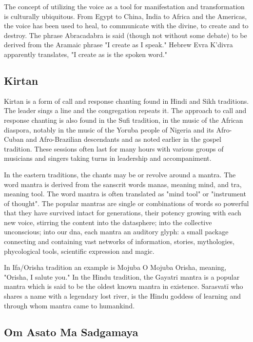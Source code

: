 \documentclass[12pt]{article}
\begin{document}
The concept of utilizing the voice as a tool for manifestation and transformation is culturally ubiquitous. From Egypt to China, India to Africa and the Americas, the voice has been used to heal, to communicate with the divine, to create and to destroy. The phrase Abracadabra is said (though not without some debate) to be derived from the Aramaic phrase "I create as I speak." Hebrew Evra K'divra apparently translates, "I create as is the spoken word."

\subsection*{Kirtan}

Kirtan is a form of call and response chanting found in Hindi and Sikh traditions. The leader sings a line and the congregation repeats it. The approach to call and response chanting is also found in the Sufi tradition, in the music of the African diaspora, notably in the music of the Yoruba people of Nigeria and its Afro-Cuban and Afro-Brazilian descendants and as noted earlier in the gospel tradition. These sessions often last for many hours with various groups of musicians and singers taking turns in leadership and accompaniment.

In the eastern traditions, the chants may be or revolve around a mantra. The word mantra is derived from the sanscrit words manas, meaning mind, and tra, meaning tool. The word mantra is often translated as "mind tool" or "instrument of thought". The popular mantras are single or combinations of words so powerful that they have survived intact for generations, their potency growing with each new voice, stirring the content into the datasphere; into the collective unconscious; into our dna, each mantra an auditory glyph: a small package connecting and containing vast networks of information, stories, mythologies, phycological tools, scientific expression and magic.

In Ifa/Orisha tradition an example is Mojuba O Mojuba Orisha, meaning, "Orisha, I salute you." In the Hindu tradition, the Gayatri mantra is a popular mantra which is said to be the oldest known mantra in existence. Sarasvatī who shares a name with a legendary lost river, is the Hindu goddess of learning and through whom mantra came to humankind.

\subsection*{Om Asato Ma Sadgamaya}
\end{document}
